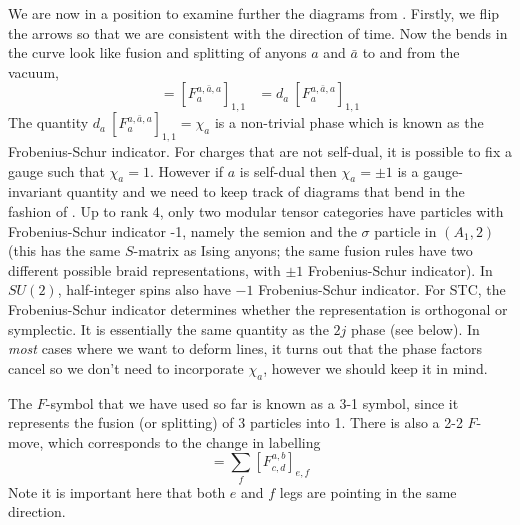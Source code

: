 \documentclass[12pt]{article}
\newcommand{\fsymbol}[6]{\mbox{$\left[ F^{#1,#2,#3}_{#4} \right]_{#5,#6}$}}
\newcommand{\fsymboltt}[6]{\mbox{$\left[ F^{#1,#2}_{#3,#4} \right]_{#5,#6}$}}
\begin{document}
We are now in a position to examine further the diagrams from . Firstly, we
flip the arrows so that we are consistent with the direction of time. Now the bends in the curve look like
fusion and splitting of anyons $a$ and $\bar{a}$ to and from the vacuum,
\begin{equation}
\begin{gathered}

\end{gathered}
= \fsymbol{a}{\bar{a}}{a}{a}{1}{1}
\begin{gathered}

\end{gathered}
= d_a \: \fsymbol{a}{\bar{a}}{a}{a}{1}{1}
\begin{gathered}

\end{gathered}
\label{eq:TwistedTimeLoop}
\end{equation}
The quantity $ d_a \: \fsymbol{a}{\bar{a}}{a}{a}{1}{1} = \chi_a$ is a non-trivial phase which
is known as the Frobenius-Schur indicator. For charges that are not self-dual, it is possible
to fix a gauge such that $\chi_a = 1$. However if $a$ is self-dual then $\chi_a = \pm 1$ is a
gauge-invariant quantity and we need to keep track of diagrams that bend in the fashion of .
Up to rank 4, only two modular tensor categories have particles with Frobenius-Schur indicator -1,
namely the semion and the $\sigma$ particle in $(A_1, 2)$ (this has the same $S$-matrix as Ising 
anyons\cite{MTCClassification};
the same fusion rules have two different possible braid representations, with $\pm 1$ Frobenius-Schur indicator).
In $SU(2)$, half-integer spins also have $-1$ Frobenius-Schur indicator.
For STC, the Frobenius-Schur indicator determines whether the representation is orthogonal or symplectic.
It is essentially the same quantity as the $2j$ phase (see below). In \emph{most} cases where we
want to deform lines, it turns out that the phase factors cancel so we don't need to incorporate $\chi_a$, however
we should keep it in mind.

The $F$-symbol that we have used so far is known as a 3-1 symbol, since it represents the fusion (or splitting)
of 3 particles into 1. There is also a 2-2 $F$-move, which corresponds to the change in labelling
\begin{equation}
\begin{gathered}

\end{gathered}
= \sum_f \fsymboltt{a}{b}{c}{d}{e}{f}
\begin{gathered}

\end{gathered}
\end{equation}
Note it is important here that both $e$ and $f$ legs are pointing in the same direction.
\end{document}
